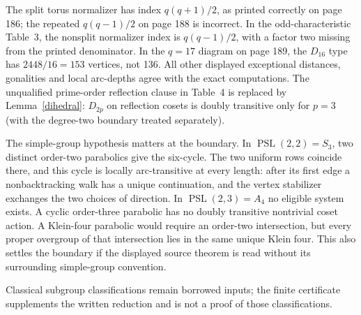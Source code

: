 \documentclass[11pt,a4paper]{article}
\newcommand{\PSL}{\operatorname{PSL}}\newcommand{\PGL}{\operatorname{PGL}}
\begin{document}
The split torus normalizer has index $q(q+1)/2$, as printed correctly on
page 186; the repeated $q(q-1)/2$ on page 188 is incorrect. In the
odd-characteristic Table~3, the nonsplit normalizer index is
$q(q-1)/2$, with a factor two missing from the printed denominator.
In the
$q=17$ diagram on page 189, the $D_{16}$ type has $2448/16=153$
vertices, not 136. All other displayed exceptional distances, gonalities
and local arc-depths agree with the exact computations. The unqualified
prime-order reflection clause in Table~4 is replaced by
Lemma~\ref{dihedral}: $D_{2p}$ on reflection cosets is doubly transitive
only for $p=3$ (with the degree-two boundary treated separately).

The simple-group hypothesis matters at the boundary. In $\PSL(2,2)=S_3$,
two distinct order-two parabolics give the six-cycle. The two uniform rows
coincide there, and this cycle is locally arc-transitive at every length:
after its first edge a nonbacktracking walk has a unique continuation, and
the vertex stabilizer exchanges the two choices of direction. In
$\PSL(2,3)=A_4$ no eligible system exists. A cyclic order-three parabolic
has no doubly transitive nontrivial coset action. A Klein-four parabolic
would require an order-two intersection, but every proper overgroup of that
intersection lies in the same unique Klein four. This also settles the
boundary if the displayed source theorem is read without its surrounding
simple-group convention.

Classical subgroup classifications remain borrowed inputs; the
finite certificate supplements the written reduction and is not a proof
of those classifications.
\end{document}
